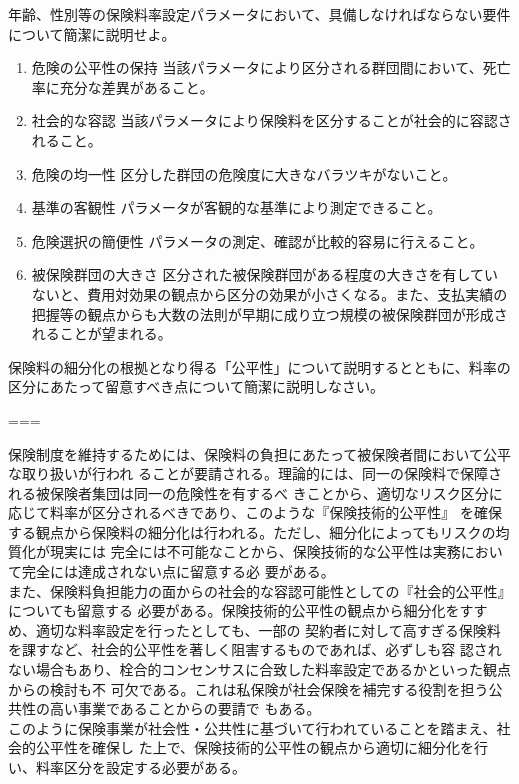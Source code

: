 \documentclass[report,gutter=10mm,fore-edge=10mm,uplatex,dvipdfmx]{jlreq}
\begin{document}

年齢、性別等の保険料率設定パラメータにおいて、具備しなければならない要件について簡潔に説明せよ。



\begin{enumerate}
\tightlist
\item
  危険の公平性の保持
  当該パラメータにより区分される群団間において、死亡率に充分な差異があること。
\item
  社会的な容認
  当該パラメータにより保険料を区分することが社会的に容認されること。
\item
  危険の均一性 区分した群団の危険度に大きなバラツキがないこと。
\item
  基準の客観性 パラメータが客観的な基準により測定できること。
\item
  危険選択の簡便性 パラメータの測定、確認が比較的容易に行えること。
\item
  被保険群団の大きさ
  区分された被保険群団がある程度の大きさを有していないと、費用対効果の観点から区分の効果が小さくなる。また、支払実績の把握等の観点からも大数の法則が早期に成り立つ規模の被保険群団が形成されることが望まれる。
\end{enumerate}


保険料の細分化の根拠となり得る「公平性」について説明するとともに、料率の区分にあたって留意すべき点について簡潔に説明しなさい。

===


保険制度を維持するためには、保険料の負担にあたって被保険者間において公平な取り扱いが行われ
ることが要請される。理論的には、同一の保険料で保障される被保険者集団は同一の危険性を有するべ
きことから、適切なリスク区分に応じて料率が区分されるべきであり、このような『保険技術的公平性』
を確保する観点から保険料の細分化は行われる。ただし、細分化によってもリスクの均質化が現実には
完全には不可能なことから、保険技術的な公平性は実務において完全には達成されない点に留意する必
要がある。\\
また、保険料負担能力の面からの社会的な容認可能性としての『社会的公平性』についても留意する
必要がある。保険技術的公平性の観点から細分化をすすめ、適切な料率設定を行ったとしても、一部の
契約者に対して高すぎる保険料を課すなど、社会的公平性を著しく阻害するものであれば、必ずしも容
認されない場合もあり、栓合的コンセンサスに合致した料率設定であるかといった観点からの検討も不
可欠である。これは私保険が社会保険を補完する役割を担う公共性の高い事業であることからの要請で
もある。\\
このように保険事業が社会性・公共性に基づいて行われていることを踏まえ、社会的公平性を確保し
た上で、保険技術的公平性の観点から適切に細分化を行い、料率区分を設定する必要がある。\\
\end{document}
